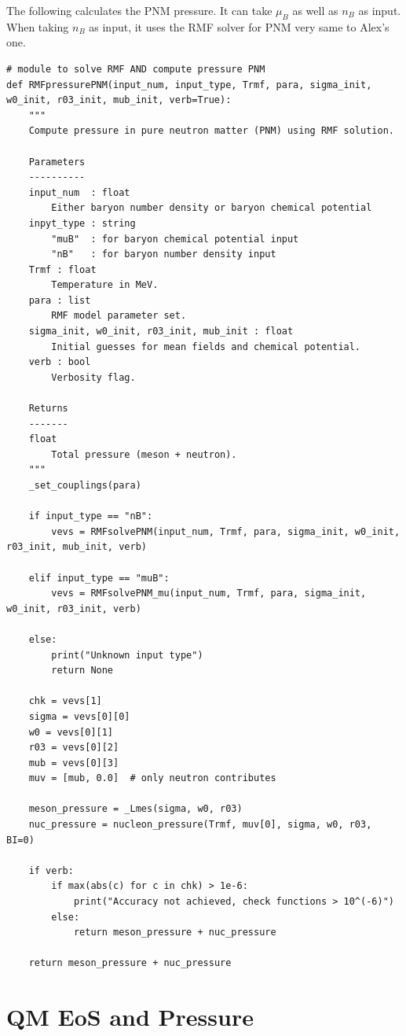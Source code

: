 \documentclass[12pt]{article}
\begin{document}
The following calculates the PNM pressure. It can take $\mu_B$ as well as $n_B$ as input. When taking $n_B$ as input, it uses the RMF solver for PNM very same to Alex's one.
\begin{lstlisting}[style=mypython]
# module to solve RMF AND compute pressure PNM
def RMFpressurePNM(input_num, input_type, Trmf, para, sigma_init, w0_init, r03_init, mub_init, verb=True):
    """
    Compute pressure in pure neutron matter (PNM) using RMF solution.

    Parameters
    ----------
    input_num  : float
        Either baryon number density or baryon chemical potential
    inpyt_type : string
        "muB"  : for baryon chemical potential input
        "nB"   : for baryon number density input
    Trmf : float
        Temperature in MeV.
    para : list
        RMF model parameter set.
    sigma_init, w0_init, r03_init, mub_init : float
        Initial guesses for mean fields and chemical potential.
    verb : bool
        Verbosity flag.

    Returns
    -------
    float
        Total pressure (meson + neutron).
    """
    _set_couplings(para)

    if input_type == "nB":
        vevs = RMFsolvePNM(input_num, Trmf, para, sigma_init, w0_init, r03_init, mub_init, verb)

    elif input_type == "muB":
        vevs = RMFsolvePNM_mu(input_num, Trmf, para, sigma_init, w0_init, r03_init, verb)

    else:
        print("Unknown input type")
        return None

    chk = vevs[1]
    sigma = vevs[0][0]
    w0 = vevs[0][1]
    r03 = vevs[0][2]
    mub = vevs[0][3]
    muv = [mub, 0.0]  # only neutron contributes

    meson_pressure = _Lmes(sigma, w0, r03)
    nuc_pressure = nucleon_pressure(Trmf, muv[0], sigma, w0, r03, BI=0)

    if verb:
        if max(abs(c) for c in chk) > 1e-6:
            print("Accuracy not achieved, check functions > 10^(-6)")
        else:
            return meson_pressure + nuc_pressure

    return meson_pressure + nuc_pressure
\end{lstlisting}



\section{QM EoS and Pressure}
\end{document}
